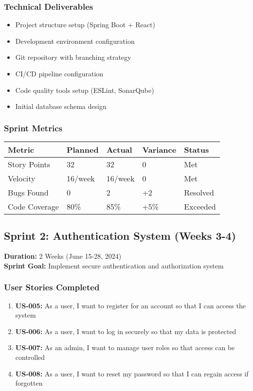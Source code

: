 \documentclass[12pt,a4paper]{article}
\begin{document}
\subsubsection{Technical Deliverables}
\begin{itemize}
    \item Project structure setup (Spring Boot + React)
    \item Development environment configuration
    \item Git repository with branching strategy
    \item CI/CD pipeline configuration
    \item Code quality tools setup (ESLint, SonarQube)
    \item Initial database schema design
\end{itemize}

\subsubsection{Sprint Metrics}
\begin{longtable}{|p{3cm}|p{2cm}|p{2cm}|p{2cm}|p{3cm}|}
\hline
\textbf{Metric} & \textbf{Planned} & \textbf{Actual} & \textbf{Variance} & \textbf{Status} \\
\hline
Story Points & 32 & 32 & 0 & \cellcolor{completedgreen}Met \\
\hline
Velocity & 16/week & 16/week & 0 & \cellcolor{completedgreen}Met \\
\hline
Bugs Found & 0 & 2 & +2 & \cellcolor{completedgreen}Resolved \\
\hline
Code Coverage & 80\% & 85\% & +5\% & \cellcolor{completedgreen}Exceeded \\
\hline
\end{longtable}

\subsection{Sprint 2: Authentication System (Weeks 3-4)}
\textbf{Duration:} 2 Weeks (June 15-28, 2024) \\
\textbf{Sprint Goal:} Implement secure authentication and authorization system

\subsubsection{User Stories Completed}
\begin{enumerate}
    \item \textbf{US-005:} As a user, I want to register for an account so that I can access the system
    \item \textbf{US-006:} As a user, I want to log in securely so that my data is protected
    \item \textbf{US-007:} As an admin, I want to manage user roles so that access can be controlled
    \item \textbf{US-008:} As a user, I want to reset my password so that I can regain access if forgotten
\end{enumerate}
\end{document}
